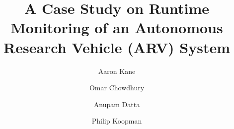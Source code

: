 \documentclass[]{llncs}
\begin{document}
\title{A Case Study on Runtime Monitoring of an Autonomous Research Vehicle (ARV) System}


\author{Aaron Kane \and Omar Chowdhury \and Anupam Datta \and Philip Koopman}



\maketitle


\end{document}
